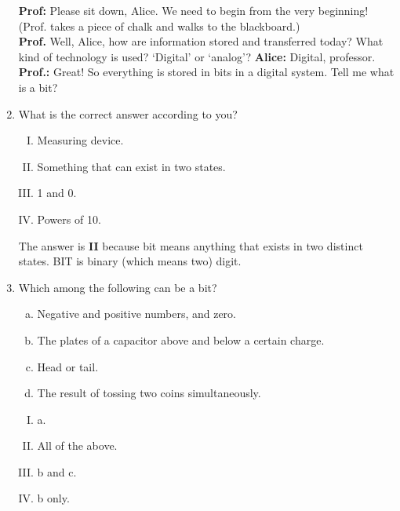 \documentclass[12pt]{article}
\newcommand\tbf[1]{\textbf{#1}}
\newcommand\tp{\tbf{Prof.: }}
\begin{document}
\begin{enumerate}[1.]
\tbf{Prof:} Please sit down, Alice. We need to begin from the very beginning! \\ \newline
(Prof. takes a piece of chalk and walks to the blackboard.) \\ \newline
\tbf{Prof.} Well, Alice, how are information stored and transferred today? What kind of technology is used? `Digital' or `analog'? \newline
\tbf{Alice:} Digital, professor. \\ \newline
\tp Great! So everything is stored in bits in a digital system. Tell me what is a bit? \newline
	\item What is the correct answer according to you?
		\begin{enumerate}[I.]
			\item Measuring device.
			\item Something that can exist in two states.
			\item 1 and 0.
			\item Powers of 10. \\ \newline
		\end{enumerate}
		The answer is \tbf{II} because bit means anything that exists in two distinct states. BIT is binary (which means two) digit.
	\item Which among the following can be a bit?
		\begin{enumerate}[a)]
			\item Negative and positive numbers, and zero.
			\item The plates of a capacitor above and below a certain charge.
			\item Head or tail.
			\item The result of tossing two coins simultaneously. \\ \newline
		\end{enumerate}
		\begin{enumerate}[I.]
			\item a.
			\item All of the above.
			\item b and c.
			\item b only. \\ \newline

\end{enumerate}
\end{enumerate}
\end{document}
